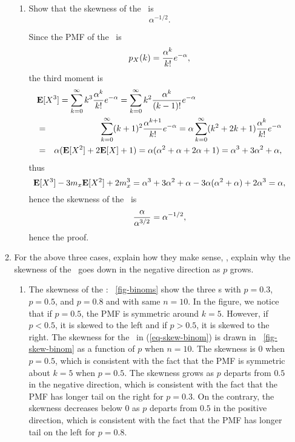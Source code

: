 \begin{enumerate}
\begin{enumerate}
\begin{enumerate}
			\item Show that the skewness of the \possrv\ is
			\begin{equation}
			\label{eq-skew-poss}
				\alpha^{-1/2}.
			\end{equation}
			\ifdefined\sol
			\begin{solution}
			Since the PMF of the \possrv\ is
			\[
				p_{X}(k) =  \frac{\alpha^k}{k!}e^{-\alpha},
			\]
			the third moment is
			\begin{eqnarray*}
				\lefteqn{
				\Exp{X^3}
				= \sumkztoi k^3 \frac{\alpha^k}{k!}e^{-\alpha}
				= \sumkztoi k^2 \frac{\alpha^k}{(k-1)!}e^{-\alpha}
				}
				\\&=&
				\sumkztoi (k+1)^2 \frac{\alpha^{k+1}}{k!}e^{-\alpha}
				= \alpha \sumkztoi (k^2+2k+1) \frac{\alpha^{k}}{k!}e^{-\alpha}
				\\&=&
				\alpha( \Exp{X^2} + 2\Exp{X} + 1 )
				= \alpha( \al^2 + \al + 2\al + 1 )
				= \al^3 + 3\al^2 + \al,
			\end{eqnarray*}
			thus
			\[
				{\bf E}[X^3] - 3m_{x} {\bf E}[X^2] + 2 m_{x}^3
				= \alpha^3 + 3\alpha^2 + \alpha - 3\alpha(\alpha^2+\alpha) + 2 \alpha^3
				= \alpha,
			\]
			hence
			the skewness of the \possrv\ is
			\[
				\frac{\alpha}{\alpha^{3/2}} = \alpha^{-1/2},
			\]
			hence the proof.
			\end{solution}
			\fi


		\end{enumerate}

		\item For the above three cases, explain how they make sense,
		\eg, explain why the skewness of the \binomrv\ goes down in the negative direction
		as $p$ grows.
		\ifdefined\sol
		\begin{solution}
		\begin{enumerate}
			\item The skewness of the \binomrv:
			\figurename~\ref{fig-binoms}
			show the three \binomrv s
			with $p=0.3$, $p=0.5$, and $p=0.8$
			and with same $n=10$.
			In the figure,
			we notice that
			if $p=0.5$,
			the PMF is symmetric around $k=5$.
			However,
			if $p<0.5$,
			it is skewed to the left
			and if $p>0.5$,
			it is skewed to the right.
			The skewness for the \binomrv\ in (\ref{eq-skew-binom})
			is drawn in \figurename~\ref{fig-skew-binom}
			as a function of $p$ when $n=10$.
			The skewness is $0$ when $p=0.5$,
			which is consistent
			with the fact that the PMF is symmetric about $k=5$
			when $p=0.5$.
			The skewness grows
			as $p$ departs from $0.5$ in the negative direction,
			which is consistent
			with the fact that the PMF has longer tail on the right
			for $p=0.3$.
			On the contrary,
			the skewness decreases below $0$
			as $p$ departs from $0.5$ in the positive direction,
			which is consistent
			with the fact that the PMF has longer tail on the left
			for $p=0.8$.


\end{enumerate}
\end{solution}
\end{enumerate}
\end{enumerate}
